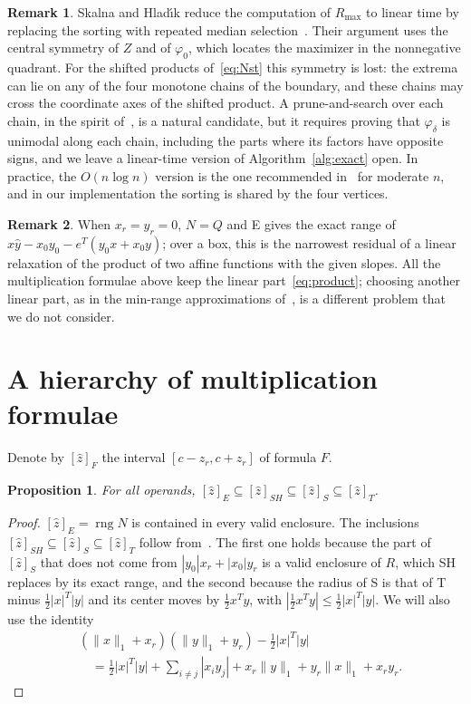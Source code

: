 \documentclass[10pt]{article}
\newtheorem{propo}{Proposition}
\theoremstyle{definition}
\newtheorem{remark}{Remark}
\newcommand{\rng}{\operatorname{rng}}
\begin{document}
\begin{remark}
Skalna and Hlad\'{\i}k reduce the computation of $R_{\max}$ to linear time by replacing the sorting with repeated median selection~\cite[Prop.~8]{skalna2017new}. Their argument uses the central symmetry of $Z$ and of $\varphi_0$, which locates the maximizer in the nonnegative quadrant. For the shifted products of~\eqref{eq:Nst} this symmetry is lost: the extrema can lie on any of the four monotone chains of the boundary, and these chains may cross the coordinate axes of the shifted product. A prune-and-search over each chain, in the spirit of~\cite[Prop.~8]{skalna2017new}, is a natural candidate, but it requires proving that $\varphi_\delta$ is unimodal along each chain, including the parts where its factors have opposite signs, and we leave a linear-time version of Algorithm~\ref{alg:exact} open. In practice, the $O(n\log n)$ version is the one recommended in~\cite{skalna2017new} for moderate $n$, and in our implementation the sorting is shared by the four vertices.
\end{remark}

\begin{remark}
When $x_r=y_r=0$, $N=Q$ and E gives the exact range of $\hat x\hat y - x_0y_0 - e^T(y_0x+x_0y)$; over a box, this is the narrowest residual of a linear relaxation of the product of two affine functions with the given slopes. All the multiplication formulae above keep the linear part~\eqref{eq:product}; choosing another linear part, as in the min-range approximations of~\cite{stolfi1997self,skalna2013minrange}, is a different problem that we do not consider.
\end{remark}

\section{A hierarchy of multiplication formulae}
\label{sec:hierarchy}

Denote by $[\hat z]_F$ the interval $[c-z_r,c+z_r]$ of formula $F$.

\begin{propo}
\label{prop:chain}
For all operands, $[\hat z]_E \subseteq [\hat z]_{SH}\subseteq[\hat z]_S\subseteq[\hat z]_T$.
\end{propo}
\begin{proof}
$[\hat z]_E=\rng N$ is contained in every valid enclosure. The inclusions $[\hat z]_{SH}\subseteq[\hat z]_S\subseteq[\hat z]_T$ follow from~\cite[Prop.~3]{skalna2017new}. The first one holds because the part of $[\hat z]_S$ that does not come from $|y_0|x_r+|x_0|y_r$ is a valid enclosure of $R$, which SH replaces by its exact range, and the second because the radius of S is that of T minus $\tfrac12|x|^T|y|$ and its center moves by $\tfrac12x^Ty$, with $|\tfrac12x^Ty|\le\tfrac12|x|^T|y|$. We will also use the identity
\[
\begin{aligned}&(\|x\|_1+x_r)(\|y\|_1+y_r) - \tfrac12|x|^T|y|\\ &\quad= \tfrac12|x|^T|y|+\sum_{i\ne j}|x_iy_j| + x_r\|y\|_1+y_r\|x\|_1+x_ry_r .\end{aligned}
\]
\end{proof}
\end{document}
